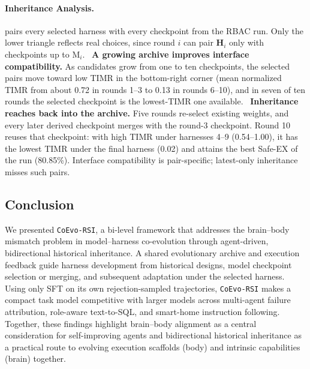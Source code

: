 \documentclass[11pt,a4paper]{article}
\newcommand{\ourmethod}{\texttt{CoEvo-RSI}}
\begin{document}
\paragraph{Inheritance Analysis.}
 pairs every selected harness with every checkpoint from the RBAC run. Only the lower triangle reflects real choices, since round $i$ can pair $\mathbf{H}_i$ only with checkpoints up to $\mathrm{M}_i$.
~\textbf{A growing archive improves interface compatibility.} As candidates grow from one to ten checkpoints, the selected pairs move toward low TIMR in the bottom-right corner (mean normalized TIMR from about 0.72 in rounds 1--3 to 0.13 in rounds 6--10), and in seven of ten rounds the selected checkpoint is the lowest-TIMR one available. ~\textbf{Inheritance reaches back into the archive.} Five rounds re-select existing weights, and every later derived checkpoint merges with the round-3 checkpoint. Round 10 reuses that checkpoint: with high TIMR under harnesses 4--9 (0.54--1.00), it has the lowest TIMR under the final harness (0.02) and attains the best Safe-EX of the run (80.85\%). Interface compatibility is pair-specific; latest-only inheritance misses such pairs.

\begin{samepage}
\section{Conclusion}
\label{sec:conclusion}

We presented \ourmethod{}, a bi-level framework that addresses the brain--body mismatch problem in model--harness co-evolution through agent-driven, bidirectional historical inheritance. A shared evolutionary archive and execution feedback guide harness development from historical designs, model checkpoint selection or merging, and subsequent adaptation under the selected harness. Using only SFT on its own rejection-sampled trajectories, \ourmethod{} makes a compact task model competitive with larger models across multi-agent failure attribution, role-aware text-to-SQL, and smart-home instruction following. Together, these findings highlight brain--body alignment as a central consideration for self-improving agents and bidirectional historical inheritance as a practical route to evolving execution scaffolds (body) and intrinsic capabilities (brain) together.

\end{samepage}
\end{document}
